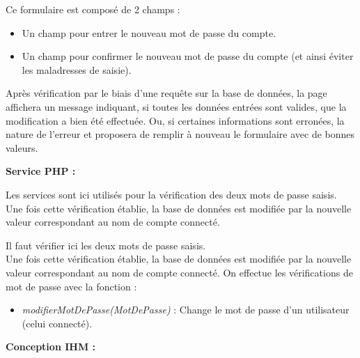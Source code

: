 			\begin{paragraphe}
				Ce formulaire est composé de 2 champs :
				\begin{itemize}
					\item Un champ pour entrer le nouveau mot de passe du compte.
					\item Un champ pour confirmer le nouveau mot de passe du compte (et ainsi éviter les maladresses de saisie).
				\end{itemize}
			\end{paragraphe}

			\begin{paragraphe}
				Après vérification par le biais d'une requête sur la base de données, la page affichera un message indiquant, si toutes les données entrées sont valides, que la modification a bien été effectuée. Ou, si certaines informations sont erronées, la nature de l'erreur et proposera de remplir à nouveau le formulaire avec de bonnes valeurs.
			\end{paragraphe}

			\begin{paragraphe}
				\textbf{Service PHP :}
			\end{paragraphe}

			\begin{paragraphe}
				Les services sont ici utilisés pour la vérification des deux mots de passe saisis. \\
				Une fois cette vérification établie, la base de données est modifiée par la nouvelle valeur correspondant au nom de compte connecté.
			\end{paragraphe}

			\begin{paragraphe}
                Il faut vérifier ici les deux mots de passe saisis. \\
                Une fois cette vérification établie, la base de données est modifiée par la nouvelle valeur correspondant au nom de compte connecté.
				On effectue les vérifications de mot de passe avec la fonction :
				\begin{itemize}
					\item \emph{modifierMotDePasse(MotDePasse)} : Change le mot de passe d'un utilisateur (celui connecté).
				\end{itemize}
			\end{paragraphe}

			\begin{paragraphe}
				\textbf{Conception IHM :}
			\end{paragraphe}


